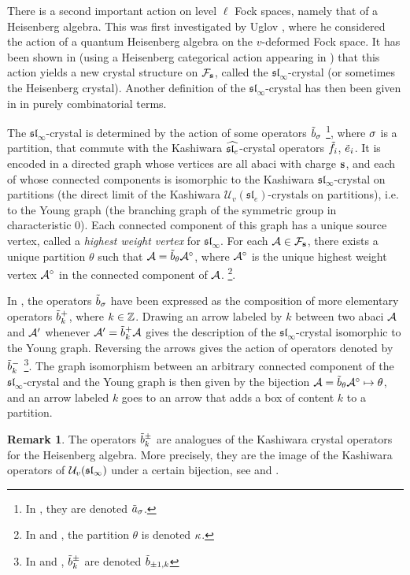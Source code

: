 \documentclass[12pt]{amsart}
\numberwithin{equation}{section}
\theoremstyle{definition}
\newtheorem{remark}[equation]{Remark}
\newcommand{\slinf}{\mathfrak{sl}_\infty}
\begin{document}
There is a second important action on level $\ell$ Fock spaces, namely that of a Heisenberg algebra.
This was first investigated by Uglov \cite{Uglov1999}, where he considered
the action of a quantum Heisenberg algebra on the $v$-deformed Fock space.
It has been shown in \cite{Losev2015} (using a Heisenberg categorical action appearing in \cite{ShanVasserot2012}) that this action yields a new crystal structure on $\mathcal{F}_{\mathbf{s}}$, called the $\slinf$-crystal
(or sometimes the Heisenberg crystal).
Another definition of the $\slinf$-crystal has then been given in \cite{Gerber2016a} in purely combinatorial terms.

The $\slinf$-crystal is determined by the action of some operators ${\tilde{b}}_\sigma$ \footnote{In \cite{ShanVasserot2012}, they are denoted ${\tilde{a}}_\sigma$.}, where $\sigma$ is a partition,
that commute with the Kashiwara $\widehat{\mathfrak{sl}_e}$-crystal operators ${\tilde{f}}_i$, ${\tilde{e}}_i$.
It is encoded in a directed graph whose vertices are all abaci with charge $\mathbf{s}$,
and each of whose connected components is isomorphic to the Kashiwara $\slinf$-crystal on
partitions (the direct limit of the Kashiwara $\mathcal{U}_v(\mathfrak{sl}_e)$-crystals on partitions),
i.e. to the Young graph \cite[Definition 5.1.2]{Sagan2001} (the branching graph of the symmetric group in characteristic $0$).
Each connected component of this graph has a unique source vertex, called a \textit{highest weight vertex} for $\slinf$. 
For each $\mathcal{A}\in\mathcal{F}_{\mathbf{s}}$, there exists a unique partition $\theta$ such that
$\mathcal{A}={\tilde{b}}_\theta\mathcal{A}^\circ$, where $\mathcal{A}^\circ$ is the unique highest weight vertex $\mathcal{A}^\circ$ in the connected component of $\mathcal{A}$.
\footnote{In \cite{Gerber2016} and \cite{Gerber2016a}, the partition $\theta$ is denoted $\kappa$.}.

In \cite[Section 6.3]{Gerber2016}, the operators ${\tilde{b}}_\sigma$ have been expressed as
the composition of more elementary operators ${\tilde{b}}^+_{k}$, where $k\in\mathbb{Z}$.
Drawing an arrow labeled by $k$ between two abaci $\mathcal{A}$ and $\mathcal{A}'$
whenever $\mathcal{A}' = {\tilde{b}}^+_{k}\mathcal{A}$ gives the description of the $\slinf$-crystal
isomorphic to the Young graph.
Reversing the arrows gives the action of operators denoted by ${\tilde{b}}^-_{k}$
\footnote{In \cite{Gerber2016} and \cite{Gerber2016a}, ${\tilde{b}}^\pm_k$ are denoted ${\tilde{b}}_{\pm1,k}$}.
The graph isomorphism between an arbitrary connected component of the $\slinf$-crystal and the Young graph is
then given by the bijection $\mathcal{A}=\tilde{b}_\theta \mathcal{A}^\circ \mapsto \theta$, and an arrow labeled $k$ goes to an arrow that adds a box of content $k$ to a partition.

\begin{remark}
The operators ${\tilde{b}}^\pm_k$ are analogues of the Kashiwara crystal operators for the Heisenberg algebra.
More precisely, they are the image of the Kashiwara operators of $\mathcal{U}_v ({\mathfrak{sl}_\infty})$ under a certain bijection, see \cite{Gerber2016} and \cite{Gerber2016a}.
\end{remark}
\end{document}
